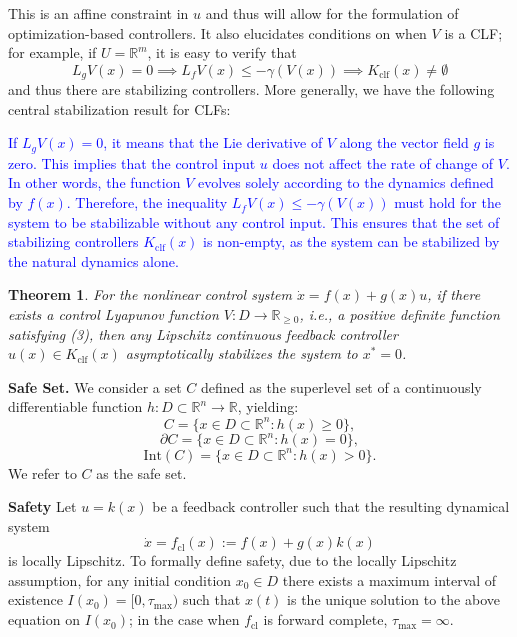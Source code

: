 \documentclass[12pt]{article}
\begin{document}
This is an affine constraint in \( u \) and thus will allow for the formulation of optimization-based controllers. It also elucidates conditions on when \( V \) is a CLF; for example, if \( U = \mathbb{R}^m \), it is easy to verify that
\[
L_g V(x) = 0 \implies L_f V(x) \leq -\gamma(V(x)) \implies K_{\text{clf}}(x) \neq \emptyset
\]
and thus there are stabilizing controllers. More generally, we have the following central stabilization result for CLFs:

\textcolor{blue}{
If \( L_g V(x) = 0 \), it means that the Lie derivative of \( V \) along the vector field \( g \) is zero. This implies that the control input \( u \) does not affect the rate of change of \( V \). In other words, the function \( V \) evolves solely according to the dynamics defined by \( f(x) \). Therefore, the inequality \( L_f V(x) \leq -\gamma(V(x)) \) must hold for the system to be stabilizable without any control input. This ensures that the set of stabilizing controllers \( K_{\text{clf}}(x) \) is non-empty, as the system can be stabilized by the natural dynamics alone.
}

\newtheorem{theorem}{Theorem}

\begin{theorem}
For the nonlinear control system \( \dot{x} = f(x) + g(x)u \), if there exists a control Lyapunov function \( V : D \to \mathbb{R}_{\geq 0} \), i.e., a positive definite function satisfying (3), then any Lipschitz continuous feedback controller \( u(x) \in K_{\text{clf}}(x) \) asymptotically stabilizes the system to \( x^* = 0 \).
\end{theorem}


\textbf{Safe Set.}
We consider a set \( C \) defined as the superlevel set of a continuously differentiable function \( h : D \subset \mathbb{R}^n \to \mathbb{R} \), yielding:
\[
C = \{ x \in D \subset \mathbb{R}^n : h(x) \geq 0 \},
\]
\[
\partial C = \{ x \in D \subset \mathbb{R}^n : h(x) = 0 \},
\]
\[
\text{Int}(C) = \{ x \in D \subset \mathbb{R}^n : h(x) > 0 \}.
\]
We refer to \( C \) as the safe set.

\textbf{Safety}
Let \( u = k(x) \) be a feedback controller such that the resulting dynamical system
\[
\dot{x} = f_{\text{cl}}(x) := f(x) + g(x)k(x)
\]
is locally Lipschitz. To formally define safety, due to the locally Lipschitz assumption, for any initial condition \( x_0 \in D \) there exists a maximum interval of existence \( I(x_0) = [0, \tau_{\max}) \) such that \( x(t) \) is the unique solution to the above equation on \( I(x_0) \); in the case when \( f_{\text{cl}} \) is forward complete, \( \tau_{\max} = \infty \). 
\end{document}
